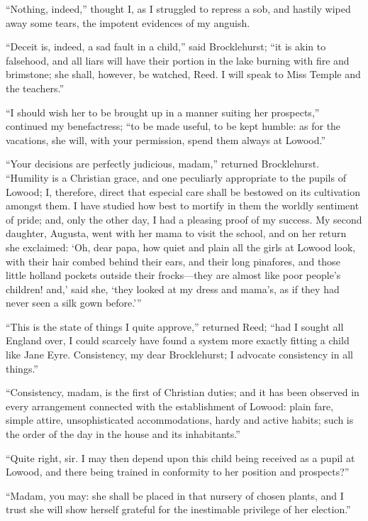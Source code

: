 \enquote{Nothing, indeed,} thought I, as I struggled to repress a sob,
and hastily wiped away some tears, the impotent evidences of my anguish.

\enquote{Deceit is, indeed, a sad fault in a child,} said \Mr{}
Brocklehurst; \enquote{it is akin to falsehood, and all liars will have
their portion in the lake burning with fire and brimstone; she shall,
however, be watched, \Mrs{} Reed. I will speak to Miss Temple and the
teachers.}

\enquote{I should wish her to be brought up in a manner suiting her
prospects,} continued my benefactress; \enquote{to be made useful, to be
kept humble: as for the vacations, she will, with your permission, spend
them always at Lowood.}

\enquote{Your decisions are perfectly judicious, madam,} returned \Mr{}
Brocklehurst. \enquote{Humility is a Christian grace, and one
peculiarly appropriate to the pupils of Lowood; I, therefore, direct
that especial care shall be bestowed on its cultivation amongst them. I
have studied how best to mortify in them the worldly sentiment of pride;
and, only the other day, I had a pleasing proof of my success. My
second daughter, Augusta, went with her mama to visit the school, and on
her return she exclaimed: \enquote{Oh, dear papa, how quiet and plain
all the girls at Lowood look, with their hair combed behind their ears,
and their long pinafores, and those little holland pockets outside their
frocks---they are almost like poor people's children! and,} said she,
\enquote{they looked at my dress and mama's, as if they had never seen
a silk gown before.}}

\enquote{This is the state of things I quite approve,} returned \Mrs{}
Reed; \enquote{had I sought all England over, I could scarcely have
found a system more exactly fitting a child like Jane Eyre. 
Consistency, my dear \Mr{} Brocklehurst; I advocate consistency in all
things.}

\enquote{Consistency, madam, is the first of Christian duties; and it
has been observed in every arrangement connected with the establishment
of Lowood: plain fare, simple attire, unsophisticated accommodations,
hardy and active habits; such is the order of the day in the house and
its inhabitants.}

\enquote{Quite right, sir. I may then depend upon this child being
received as a pupil at Lowood, and there being trained in conformity to
her position and prospects?}

\enquote{Madam, you may: she shall be placed in that nursery of chosen
plants, and I trust she will show herself grateful for the inestimable
privilege of her election.}

